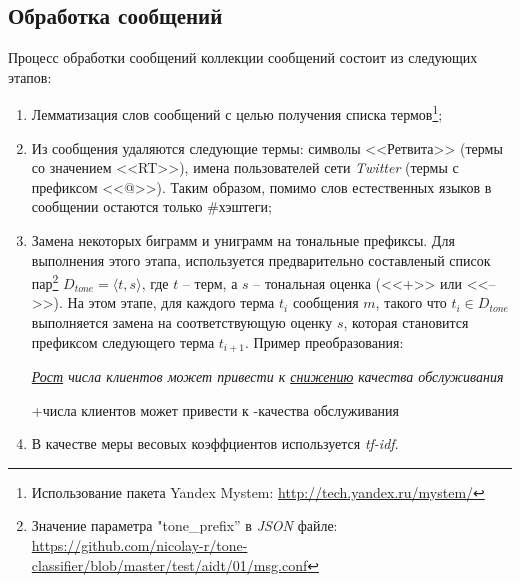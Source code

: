     \subsection{Обработка сообщений}
    \label{sec:buildingMsgProcessing}
    Процесс обработки сообщений коллекции сообщений состоит из следующих этапов:
    \begin{enumerate}
        \item Лемматизация слов сообщений с целью получения списка термов\footnote{
            Использование пакета Yandex Mystem:
            \url{http://tech.yandex.ru/mystem/}
        };

        \item Из сообщения удаляются следующие термы:
            символы <<Ретвита>> (термы со значением <<RT>>),
            имена пользователей сети {\it Twitter} (термы с префиксом <<@>>).
            Таким образом, помимо слов естественных языков в сообщении остаются
            только \#хэштеги;
        \item Замена некоторых биграмм и униграмм на тональные префиксы.
            Для выполнения этого этапа, используется предварительно составленый
            список пар\footnote{
               Значение параметра "tone\_prefix'' в {\it JSON} файле:
               \url{https://github.com/nicolay-r/tone-classifier/blob/master/test/aidt/01/msg.conf}
            }
            $D_{tone} = {\langle t, s\rangle}$, где $t$ -- терм, а $s$ --
            тональная оценка (<<+>> или <<-->>). На этом этапе, для каждого терма $t_i$
            сообщения $m$, такого что $t_i \in D_{tone}$ выполняется замена на соответствующую
            оценку $s$, которая становится префиксом следующего терма $t_{i+1}$.
            Пример преобразования:
            \begin{center}
                \it
                \underline{Рост} числа клиентов может привести к \underline{снижению} качества обслуживания

               +числа клиентов может привести к -качества обслуживания
            \end{center}
        \item В качестве меры весовых коэффциентов используется {\it tf-idf}.
    \end{enumerate}

